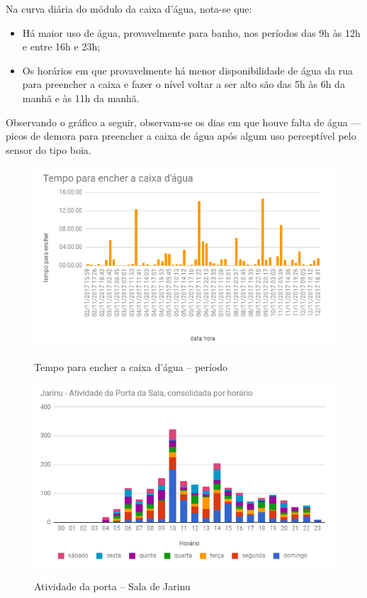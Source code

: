 Na curva diária do módulo da caixa d’água, nota-se que:

\begin{itemize}
	\item Há maior uso de água, provavelmente para banho, nos períodos das 9h às 12h e entre 16h e 23h;
	\item Os horários em que provavelmente há menor disponibilidade de água da rua para preencher a caixa e fazer o nível voltar a ser alto são das 5h às 6h da manhã e às 11h da manhã.

\end{itemize}

Observando o gráfico a seguir, observam-se os dias em que houve falta de água  --- picos de demora para preencher a caixa de água após algum uso perceptível pelo sensor do tipo boia.

\begin{figure}[H]
	\centering
	\caption{Tempo para encher a caixa d'água -- período}
	\includegraphics[width=1.0\textwidth]{tempoPeriodocxAgua}
	\label{fig:tempoPeriodocxAgua}
\end{figure}

\begin{figure}[H]
	\centering
	\caption{Atividade da porta -- Sala de Jarinu}
	\includegraphics[width=1.0\textwidth]{AtivPortaSalaJarinu}
	\label{fig:AtivPortaSalaJarinu}
\end{figure}

